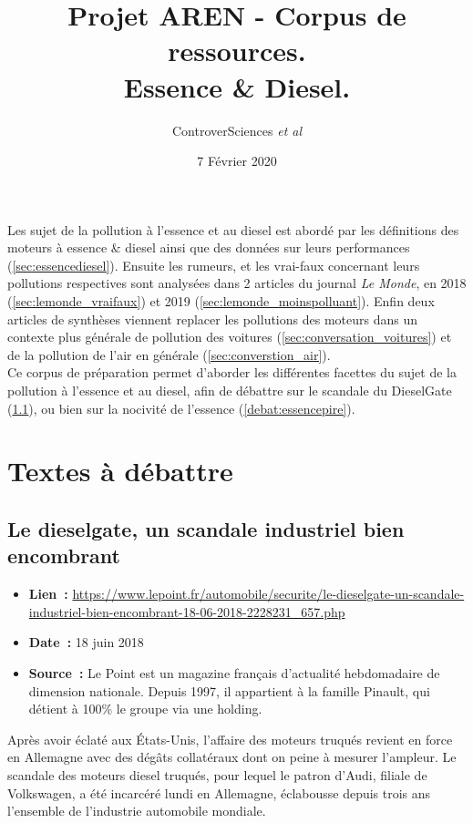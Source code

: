 \documentclass[8pt]{article}
\author{ControverSciences\textit{ et al} }
\title{Projet AREN - Corpus de ressources. \\ Essence \& Diesel.}
\date{7 Février 2020}
\begin{document}
\maketitle

Les sujet de la pollution à l'essence et au diesel est abordé par les définitions des moteurs à essence \& diesel ainsi que des données sur leurs performances (\ref{sec:essencediesel}). Ensuite les rumeurs, et les vrai-faux concernant leurs pollutions respectives sont analysées dans 2 articles du journal \textit{Le Monde}, en 2018 (\ref{sec:lemonde_vraifaux}) et 2019 (\ref{sec:lemonde_moinspolluant}). Enfin deux articles de synthèses viennent replacer les pollutions des moteurs dans un contexte plus générale de pollution des voitures (\ref{sec:conversation_voitures}) et de la pollution de l'air en générale (\ref{sec:converstion_air}).\\

Ce corpus de préparation permet d'aborder les différentes facettes du sujet de la pollution à l'essence et au diesel, afin de débattre sur le scandale du DieselGate (\ref{debat:dieselgate}), ou bien sur la nocivité de l'essence (\ref{debat:essencepire}).

\tableofcontents

\newpage
\section{Textes à débattre}

\subsection{Le dieselgate, un scandale industriel bien encombrant}
\label{debat:dieselgate}

\begin{itemize}
	\item \textbf{Lien~: } \url{https://www.lepoint.fr/automobile/securite/le-dieselgate-un-scandale-industriel-bien-encombrant-18-06-2018-2228231_657.php} 
	\item \textbf{Date~: } 18 juin 2018
	\item \textbf{Source~: } Le Point est un magazine français d'actualité hebdomadaire de dimension nationale. Depuis 1997, il appartient à la famille Pinault, qui détient à 100\% le groupe via une holding. 
\end{itemize}

Après avoir éclaté aux États-Unis, l'affaire des moteurs truqués revient en force en Allemagne avec des dégâts collatéraux dont on peine à mesurer l'ampleur. Le scandale des moteurs diesel truqués, pour lequel le patron d'Audi, filiale de Volkswagen, a été incarcéré lundi en Allemagne, éclabousse depuis trois ans l'ensemble de l'industrie automobile mondiale.\\
\end{document}
